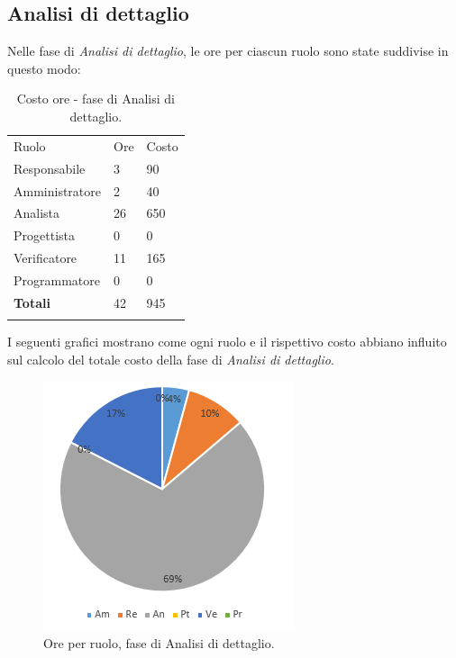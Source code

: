 \documentclass[a4paper]{article}
\begin{document}
		\subsection{Analisi di dettaglio}
			Nelle fase di \emph{Analisi di dettaglio}, le ore per ciascun ruolo sono state suddivise in questo modo:
			\begin{table}[H]
				\begin{tabularx}{\textwidth}{Y Y Y}
					Ruolo & Ore & Costo \\
					Responsabile & 3 & 90 \\
					Amministratore & 2 & 40 \\
					Analista & 26 & 650\\
					Progettista & 0 & 0\\
					Verificatore & 11 & 165\\
					Programmatore & 0 & 0 \\
					\textbf{Totali} & 42 & 945 \\
				\end{tabularx}
				\caption{Costo ore - fase di Analisi di dettaglio. } 
				\label{TCDettaglio}
			\end{table}
			I seguenti grafici mostrano come ogni ruolo e il rispettivo costo abbiano influito sul calcolo del totale 
			costo della fase di \emph{Analisi di dettaglio}.
			\begin{figure}[H]
				\centering
				\includegraphics[scale=0.7]{pc_dettaglio}
				\caption{Ore per ruolo, fase di Analisi di dettaglio.}
			\end{figure}
\end{document}
